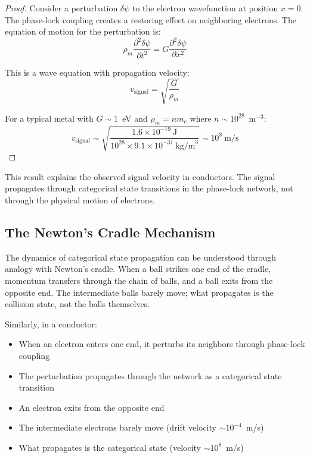 \documentclass[twocolumn,showpacs,preprintnumbers,amsmath,amssymb,prd]{revtex4-2}
\begin{document}
\begin{proof}
Consider a perturbation $\delta\psi$ to the electron wavefunction at position $x = 0$. The phase-lock coupling creates a restoring effect on neighboring electrons. The equation of motion for the perturbation is:
\begin{equation}
\rho_m \frac{\partial^2 \delta\psi}{\partial t^2} = G \frac{\partial^2 \delta\psi}{\partial x^2}
\label{eq:wave_equation}
\end{equation}

This is a wave equation with propagation velocity:
\begin{equation}
v_{\text{signal}} = \sqrt{\frac{G}{\rho_m}}
\end{equation}

For a typical metal with $G \sim 1$~eV and $\rho_m = n m_e$ where $n \sim 10^{28}$~m$^{-3}$:
\begin{equation}
v_{\text{signal}} \sim \sqrt{\frac{1.6 \times 10^{-19}~\text{J}}{10^{28} \times 9.1 \times 10^{-31}~\text{kg/m}^3}} \sim 10^8~\text{m/s}
\end{equation}
\end{proof}

This result explains the observed signal velocity in conductors. The signal propagates through categorical state transitions in the phase-lock network, not through the physical motion of electrons.

\subsection{The Newton's Cradle Mechanism}

The dynamics of categorical state propagation can be understood through analogy with Newton's cradle. When a ball strikes one end of the cradle, momentum transfers through the chain of balls, and a ball exits from the opposite end. The intermediate balls barely move; what propagates is the collision state, not the balls themselves.

Similarly, in a conductor:
\begin{itemize}
\item When an electron enters one end, it perturbs its neighbors through phase-lock coupling
\item The perturbation propagates through the network as a categorical state transition
\item An electron exits from the opposite end
\item The intermediate electrons barely move (drift velocity $\sim 10^{-4}$~m/s)
\item What propagates is the categorical state (velocity $\sim 10^8$~m/s)
\end{itemize}
\end{document}
